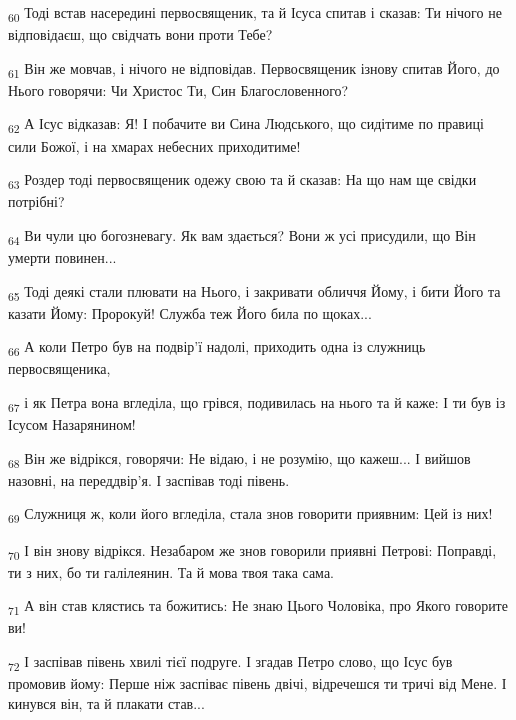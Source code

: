 \begin{tcolorbox}
\textsubscript{60} Тоді встав насередині первосвященик, та й Ісуса спитав і сказав: Ти нічого не відповідаєш, що свідчать вони проти Тебе?
\end{tcolorbox}
\begin{tcolorbox}
\textsubscript{61} Він же мовчав, і нічого не відповідав. Первосвященик ізнову спитав Його, до Нього говорячи: Чи Христос Ти, Син Благословенного?
\end{tcolorbox}
\begin{tcolorbox}
\textsubscript{62} А Ісус відказав: Я! І побачите ви Сина Людського, що сидітиме по правиці сили Божої, і на хмарах небесних приходитиме!
\end{tcolorbox}
\begin{tcolorbox}
\textsubscript{63} Роздер тоді первосвященик одежу свою та й сказав: На що нам ще свідки потрібні?
\end{tcolorbox}
\begin{tcolorbox}
\textsubscript{64} Ви чули цю богозневагу. Як вам здається? Вони ж усі присудили, що Він умерти повинен...
\end{tcolorbox}
\begin{tcolorbox}
\textsubscript{65} Тоді деякі стали плювати на Нього, і закривати обличчя Йому, і бити Його та казати Йому: Пророкуй! Служба теж Його била по щоках...
\end{tcolorbox}
\begin{tcolorbox}
\textsubscript{66} А коли Петро був на подвір'ї надолі, приходить одна із служниць первосвященика,
\end{tcolorbox}
\begin{tcolorbox}
\textsubscript{67} і як Петра вона вгледіла, що грівся, подивилась на нього та й каже: І ти був із Ісусом Назарянином!
\end{tcolorbox}
\begin{tcolorbox}
\textsubscript{68} Він же відрікся, говорячи: Не відаю, і не розумію, що кажеш... І вийшов назовні, на переддвір'я. І заспівав тоді півень.
\end{tcolorbox}
\begin{tcolorbox}
\textsubscript{69} Служниця ж, коли його вгледіла, стала знов говорити приявним: Цей із них!
\end{tcolorbox}
\begin{tcolorbox}
\textsubscript{70} І він знову відрікся. Незабаром же знов говорили приявні Петрові: Поправді, ти з них, бо ти галілеянин. Та й мова твоя така сама.
\end{tcolorbox}
\begin{tcolorbox}
\textsubscript{71} А він став клястись та божитись: Не знаю Цього Чоловіка, про Якого говорите ви!
\end{tcolorbox}
\begin{tcolorbox}
\textsubscript{72} І заспівав півень хвилі тієї подруге. І згадав Петро слово, що Ісус був промовив йому: Перше ніж заспіває півень двічі, відречешся ти тричі від Мене. І кинувся він, та й плакати став...
\end{tcolorbox}
